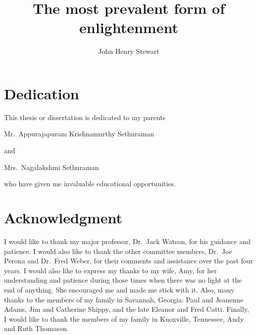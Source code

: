 \documentclass[draft]{uoflthesis} %
\title{The most prevalent form of enlightenment}
\author{John Henry Stewart}
\begin{document}
\frontmatter

\maketitle

\copyrightpage


\section*{Dedication}
\begin{center}
This thesis or dissertation is dedicated to my parents

Mr.~Appurajapuram Krishnamurthy Sethuraman

and

Mrs.~Nagalakshmi Sethuraman

who have given me invaluable educational opportunities.
\end{center}

\section*{Acknowledgment}

I would like to thank my major professor, Dr.~Jack Watson, for his guidance and
patience. I would also like to thank the other committee members, Dr.~Joe Perona and
Dr.~Fred Weber, for their comments and assistance over the past four years. I would also
like to express my thanks to my wife, Amy, for her understanding and patience during
those times when there was no light at the end of anything. She encouraged me and made
me stick with it. Also, many thanks to the members of my family in Savannah, Georgia:
Paul and Jeanenne Adams, Jim and Catherine Shippy, and the late Eleanor and Fred Catti.
Finally, I would like to thank the members of my family in Knoxville, Tennessee, Andy
and Ruth Thomason.

\begin{abstract}
\lipsum
\end{abstract}
\end{document}
